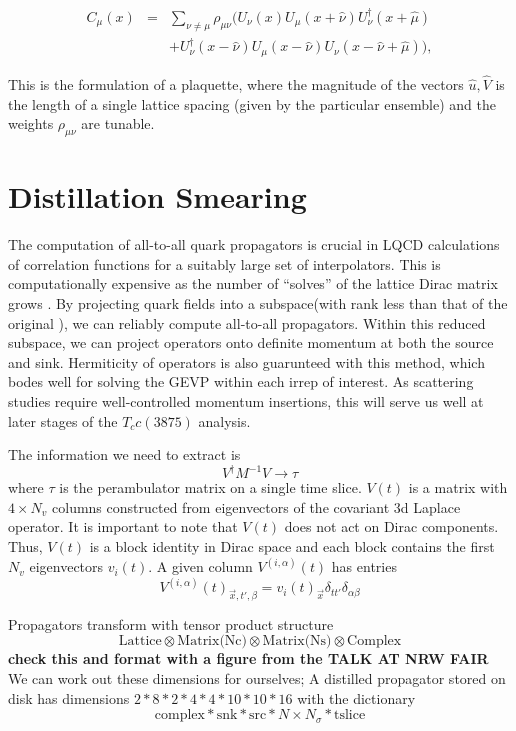 \begin{eqnarray}
 C_\mu(x)&=&\sum_{\nu\neq \mu}\rho_{\mu\nu}\biggl(
 U_\nu(x) U_\mu(x\!+\!\hat{\nu}) U_\nu^\dagger(x\!+\!\hat{\mu})\nonumber\\
&&+ U^\dagger_\nu(x\!-\!\hat{\nu}) U_\mu(x\!-\!\hat{\nu})
  U_\nu(x\!-\!\hat{\nu}\!+\!\hat{\mu})
\biggr), \label{eq:Cdef}
\end{eqnarray}

This is the formulation of a plaquette, where the magnitude of the vectors $\hat{u}, \hat{V}$ is the length of a single lattice spacing (given by the particular ensemble) and the weights $\rho_{\mu\nu}$ are tunable. 

\section{Distillation Smearing}
The computation of all-to-all quark propagators is crucial in LQCD calculations of correlation functions for a suitably large set of interpolators. This is computationally expensive as the number of ``solves'' of the lattice Dirac matrix grows . By projecting quark fields into a subspace(with rank less than that of the original ), we can reliably compute all-to-all propagators\cite{peardon_novel_2009}. Within this reduced subspace, we can project operators onto definite momentum at both the source and sink. Hermiticity of operators is also guarunteed with this method, which bodes well for solving the GEVP within each irrep of interest. As scattering studies require well-controlled momentum insertions, this will serve us well at later stages of the $T_cc(3875)$ analysis.  

The information we need to extract is 
$$ V^{\dagger}M^{-1}V \rightarrow \tau $$ 
where $\tau$ is the perambulator matrix on a single time slice. 
$V(t)$ is a matrix with $4 \times N_v $  columns constructed from eigenvectors of the covariant 3d Laplace operator. It is important to note that $V(t)$ does not act on Dirac components. Thus, $V(t)$ is a block identity in Dirac space and each block contains the first $N_v$ eigenvectors $v_i(t)$. A given column $V^{(i,\alpha)}(t)$ has entries 
$$ V^{(i,\alpha)}(t)_{\vec{x},t',\beta} = v_i(t)_{\vec{x}} \delta_{tt'}\delta_{\alpha\beta}$$


Propagators transform with tensor product structure 
$$\text{Lattice} \otimes \text{Matrix(Nc)} \otimes \text{Matrix(Ns)} \otimes \text{Complex}$$
\textbf{check this and format with a figure from the TALK AT NRW FAIR }
We can work out these dimensions for ourselves; A distilled propagator stored on disk has dimensions 
$ 2 * 8 *2 *4 *4 *10 * 10 * 16$ 
with the dictionary 
$$\text{} \text{complex} * \text{snk} * \text{src} * N \times N_{\sigma} * \text{tslice}$$
